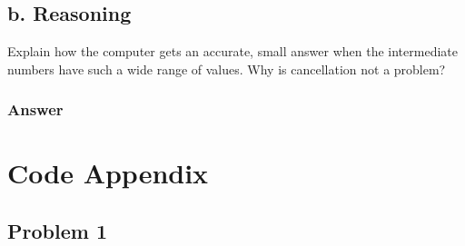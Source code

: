 \documentclass{article}
\begin{document}
	
	
	\subsection{b. Reasoning}
	Explain how the computer gets an accurate, small answer when the intermediate numbers have such a wide range of values.  Why is cancellation not a problem?
	
	\subsubsection{Answer}

	
	
	
	
	\section{Code Appendix}
	
	\subsection{Problem 1}
	
\end{document}
